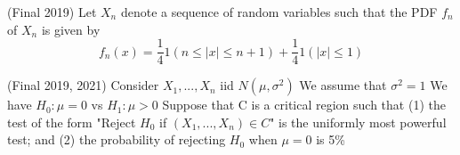\documentclass[answers]{exam}
\begin{document}
\begin{questions}

\question (Final 2019) Let $X_n$ denote a sequence of random variables such that the PDF $f_n$ of $X_n$ is given by
$$f_n(x)=\frac{1}{4}1(n \leq |x| \leq n + 1) + \frac{1}{4}1(|x|\leq 1)$$

\question (Final 2019, 2021) Consider $X_1,...,X_n$ iid $N(\mu,\sigma^2)$ We assume that $\sigma^2 = 1$ We have $H_0 : \mu = 0$ vs $H_1 : \mu > 0$ Suppose that C is a critical region such that (1) the test of the form "Reject $H_0$ if $(X_1,...,X_n) \in C$" is the uniformly most powerful test; and (2) the probability of rejecting $H_0$ when $\mu = 0$ is 5\%


\end{questions}
\end{document}
